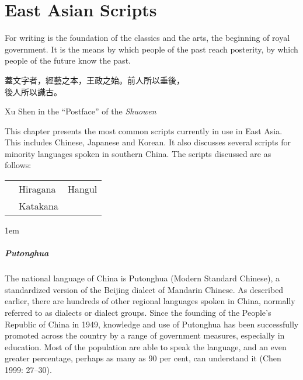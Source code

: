 \newfontfamily{}
\pagestyle{headings}
\chapter{East Asian Scripts}
\epigraph{

For writing is the foundation of the classics and the arts, the beginning of
royal government. It is the means by which people of the past reach posterity,
by which people of the future know the past. 

{\cjk 蓋文字者，經藝之本，王政之始。前人所以垂後，\\ 後人所以識古。}
}{ Xu Shen  in the ``Postface'' of the \emph{Shuowen}}

\bigskip

\noindent This chapter presents the most common scripts currently in use in East Asia. This includes Chinese, Japanese and Korean. It also discusses several scripts for minority languages spoken in southern China. The scripts discussed are as follows:


\begin{center}
\begin{tabular}{lll}
\nameref{s:han} &Hiragana &Hangul\\
\nameref{s:bopomofo} &Katakana &\nameref{s:yi}\\
\end{tabular}
\end{center}
\bigskip

\parindent1em

\paragraph{Putonghua}The national language of China is Putonghua (Modern Standard Chinese), a standardized version of the Beijing dialect of Mandarin Chinese. As described earlier, there are hundreds of other regional
languages spoken in China, normally referred to as dialects or dialect
groups. Since the founding of the People’s Republic of China in 1949,
knowledge and use of Putonghua has been successfully promoted across
the country by a range of government measures, especially in education.
Most of the population are able to speak the language, and an even
greater percentage, perhaps as many as 90 per cent, can understand it
(Chen 1999: 27–30).


